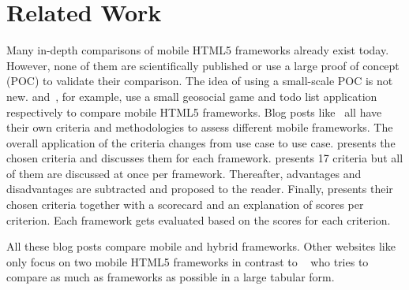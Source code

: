\documentclass[a4paper]{artikel3}
\begin{document}


\section{Related Work} %
\label{sec:related-work}

Many in-depth comparisons of mobile HTML5 frameworks already exist today.  
However, none of them are scientifically published or use a large proof of concept (POC) to validate their comparison.  
The idea of using a small-scale POC is not new.  
\cite{Oeflman2011} and~\cite{Kosmaczewski2012},  for example,  use a small geosocial game and todo list application respectively to compare mobile HTML5 frameworks.
Blog posts like~\cite{Sarrafi2012a,Ayuso2012,Rozynski2011} all have their own criteria and methodologies to assess different mobile frameworks.  
The overall application of the criteria changes from use case to use case.  
\cite{Rozynski2011} presents the chosen criteria and discusses them for each framework.  
\cite{Ayuso2012} presents 17 criteria but all of them are discussed at once per framework.  
Thereafter,  advantages and disadvantages are subtracted and proposed to the reader.  
Finally, \cite{Sarrafi2012a} presents their chosen criteria together with a scorecard and an explanation of scores per criterion.  
Each framework gets evaluated based on the scores for each criterion.

All these blog posts compare mobile and hybrid frameworks.  
Other websites like~\cite{Bristowe2012,Burris} only focus on two mobile HTML5 frameworks in contrast to ~\cite{Falk2011} who tries to compare as much as frameworks as possible in a large tabular form.

\end{document}
